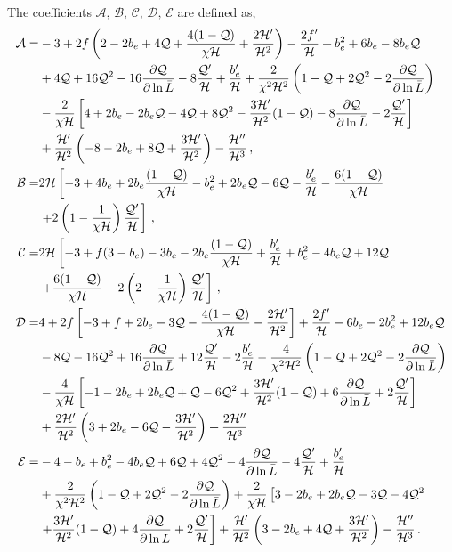 The coefficients $\mathcal{A},\,\mathcal{B},\,\mathcal{C},\,\mathcal{D},\,\mathcal{E}$ are defined as, 
\begin{align}
	\mathcal{A} =& -3 + 2f \left(2 - 2b_e + 4 \mathcal{Q} + \frac{4(1-\mathcal{Q})}{\chi\mathcal{H}} + \frac{2\mathcal{H}'}{\mathcal{H}^{2}} \right) -\frac{2f'}{\mathcal{H}} + b_e^2 + 6 b_e - 8 b_e \mathcal{Q} \nonumber \\
	& + 4 \mathcal{Q} + 16 \mathcal{Q}^2 - 16\frac{\partial \mathcal{Q}}{\partial \ln\bar{L}} -8 \frac{\mathcal{Q}'}{\mathcal{H}} + \frac{b_e'}{\mathcal{H}} + \frac{2}{\chi^{2}\mathcal{H}^2} \left(1 - \mathcal{Q} + 2\mathcal{Q}^2 - 2\frac{\partial \mathcal{Q}}{\partial \ln{\bar{L}}} \right) \nonumber \\
	& - \frac{2}{\chi \mathcal{H}} \left[ 4 + 2b_e - 2 b_e \mathcal{Q} - 4\mathcal{Q} + 8\mathcal{Q}^2 - \frac{3\mathcal{H}'}{\mathcal{H}^2}(1 - \mathcal{Q}) - 8\frac{\partial \mathcal{Q}}{\partial \ln{\bar{L}}} - 2\frac{\mathcal{Q}'}{\mathcal{H}} \right] \nonumber \\
	& + \frac{\mathcal{H}'}{\mathcal{H}^2} \left(-8 - 2b_e + 8\mathcal{Q} + \frac{3\mathcal{H}'}{\mathcal{H}^2} \right) - \frac{\mathcal{H}''}{\mathcal{H}^3}\,,\label{eq:bcA} \\
	\mathcal{B} =& 2\mathcal{H} \left[ -3 + 4 b_e + 2b_e \frac{(1 - \mathcal{Q})}{\chi \mathcal{H}} -b_e^2 + 2b_e \mathcal{Q} - 6\mathcal{Q} - \frac{b_e'}{\mathcal{H}} - \frac{6( 1 - \mathcal{Q})}{\chi\mathcal{H}} \right. \nonumber \\
	& \left. + 2\left(1 - \frac{1}{\chi\mathcal{H}} \right) \frac{\mathcal{Q}'}{\mathcal{H}} \right]\,,\\
	\mathcal{C} =& 2\mathcal{H} \left[ -3 + f(3 - b_e) - 3b_e - 2 b_e \frac{(1 - \mathcal{Q})}{\chi\mathcal{H}} + \frac{b_e'}{\mathcal{H}} + b_e^2 - 4 b_e \mathcal{Q} + 12\mathcal{Q} \right. \nonumber \\
	&\left. + \frac{6 (1 - \mathcal{Q})}{\chi\mathcal{H}} - 2\left(2 -\frac{1}{\chi\mathcal{H}}\right) \frac{\mathcal{Q}'}{\mathcal{H}} \right]\,, \\
	\mathcal{D} =& 4 +2f\left[ -3 + f + 2b_e - 3\mathcal{Q} - \frac{4(1 - \mathcal{Q})}{\chi\mathcal{H}} - \frac{2\mathcal{H}'}{\mathcal{H}^2} \right] +\frac{2f'}{\mathcal{H}} - 6b_e - 2 b_e^2 + 12 b_e\mathcal{Q} \nonumber \\
	& - 8 \mathcal{Q} - 16\mathcal{Q}^2 + 16 \frac{\partial \mathcal{Q}}{\partial \ln{\bar{L}}} + 12 \frac{\mathcal{Q}'}{\mathcal{H}} - 2\frac{b_e'}{\mathcal{H}} - \frac{4}{\chi^2 \mathcal{H}^2} \left(1 - \mathcal{Q} + 2\mathcal{Q}^2 - 2 \frac{\partial \mathcal{Q}}{\partial \ln{\bar{L}}} \right) \nonumber \\
	& - \frac{4}{\chi \mathcal{H}} \left[ -1 -2b_e + 2b_e\mathcal{Q} + \mathcal{Q} - 6\mathcal{Q}^2 + \frac{3\mathcal{H}'}{\mathcal{H}^2}(1 - \mathcal{Q}) + 6 \frac{\partial \mathcal{Q}}{\partial \ln{\bar{L}}} + 2\frac{\mathcal{Q}'}{\mathcal{H}} \right] \nonumber \\
	&+ \frac{2\mathcal{H}'}{\mathcal{H}^2} \left(3 + 2b_e - 6\mathcal{Q} - \frac{3\mathcal{H}'}{\mathcal{H}^2} \right) + \frac{2\mathcal{H}''}{\mathcal{H}^3} \\
	\mathcal{E} =& -4 - b_e + b_e^2 - 4b_e\mathcal{Q} + 6 \mathcal{Q} + 4\mathcal{Q}^2 - 4\frac{\partial \mathcal{Q}}{\partial \ln{\bar{L}}} - 4\frac{\mathcal{Q}'}{\mathcal{H}} + \frac{b_e'}{\mathcal{H}} \nonumber \\
	&+ \frac{2}{\chi^2\mathcal{H}^2} \left(1 - \mathcal{Q} + 2\mathcal{Q}^2 - 2\frac{\partial \mathcal{Q}}{\partial \ln{\bar{L}}}\right) + \frac{2}{\chi\mathcal{H}} \left[3 - 2b_e + 2b_e \mathcal{Q} - 3\mathcal{Q} - 4\mathcal{Q}^2 \right. \nonumber \\
	&\left. + \frac{3\mathcal{H}'}{\mathcal{H}^2} (1 - \mathcal{Q}) + 4\frac{\partial \mathcal{Q}}{\partial \ln{\bar{L}}} + 2\frac{\mathcal{Q}'}{\mathcal{H}} \right] + \frac{\mathcal{H}'}{\mathcal{H}^2} \left(3 - 2b_e + 4\mathcal{Q} + \frac{3\mathcal{H}'}{\mathcal{H}^2} \right) - \frac{\mathcal{H}''}{\mathcal{H}^3}\,.
\end{align}
